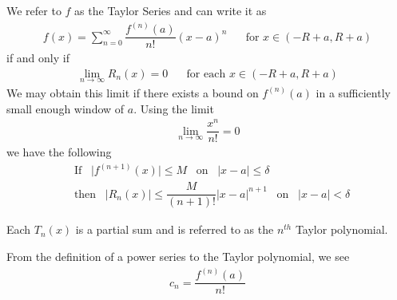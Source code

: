 We refer to $f$ as the Taylor Series and can write it as
\begin{align*}
    f(x) = \sum_{n=0}^{\infty} \dfrac{f^{(n)}(a)}{n!}(x-a)^{n} \hspace{20pt} \text{for} \hspace{4pt} x \in (-R + a, R + a)
\end{align*}
if and only if
\begin{align*}
    \lim_{n \longrightarrow \infty} R_{n}(x) = 0 \hspace{20pt} \text{for each} \hspace{4pt} x \in (-R + a, R + a)
\end{align*}
We may obtain this limit if there exists a bound on $f^{(n)}(a)$ in a sufficiently small enough window of $a$. Using the limit
\begin{align*}
    \lim_{n \longrightarrow \infty} \dfrac{x^{n}}{n!} = 0
\end{align*}
we have the following
\begin{align*}
    &\text{If} \hspace{10pt} \lvert f^{(n+1)}(x) \rvert \leq M \hspace{10pt} \text{on} \hspace{10pt} \lvert x - a \rvert \leq \delta \\[2ex]
    &\text{then} \hspace{10pt} \lvert R_{n}(x) \rvert \leq \dfrac{M}{(n+1)!} \lvert x - a \rvert^{n+1} \hspace{10pt} \text{on} \hspace{10pt} \lvert x - a \rvert < \delta
\end{align*}

\begin{note}
Each $T_{n}(x)$ is a partial sum and is referred to as the $n^{th}$ Taylor polynomial.
\end{note}

\begin{note}
From the definition of a power series to the Taylor polynomial, we see
\begin{align*}
    c_{n} = \dfrac{f^{(n)}(a)}{n!}
\end{align*}
\end{note}

